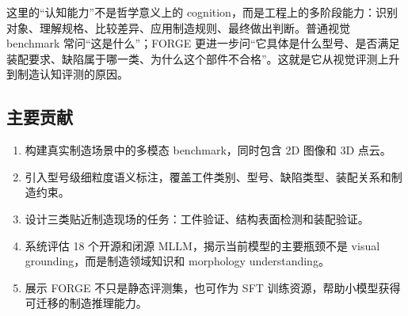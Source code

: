 这里的“认知能力”不是哲学意义上的 cognition，而是工程上的多阶段能力：识别对象、理解规格、比较差异、应用制造规则、最终做出判断。普通视觉 benchmark 常问“这是什么”；FORGE 更进一步问“它具体是什么型号、是否满足装配要求、缺陷属于哪一类、为什么这个部件不合格”。这就是它从视觉评测上升到制造认知评测的原因。

\subsection{主要贡献}

\begin{enumerate}
    \item 构建真实制造场景中的多模态 benchmark，同时包含 2D 图像和 3D 点云。
    \item 引入型号级细粒度语义标注，覆盖工件类别、型号、缺陷类型、装配关系和制造约束。
    \item 设计三类贴近制造现场的任务：工件验证、结构表面检测和装配验证。
    \item 系统评估 18 个开源和闭源 MLLM，揭示当前模型的主要瓶颈不是 visual grounding，而是制造领域知识和 morphology understanding。
    \item 展示 FORGE 不只是静态评测集，也可作为 SFT 训练资源，帮助小模型获得可迁移的制造推理能力。
\end{enumerate}
